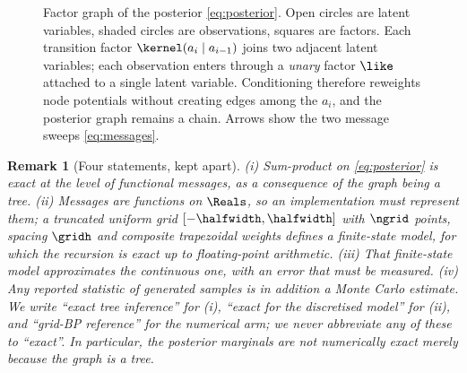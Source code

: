 \documentclass{article}
\newtheorem{remark}{Remark}
\begin{document}
\begin{figure}[t]
\centering
{}
\caption{Factor graph of the posterior \eqref{eq:posterior}. Open circles are latent variables,
shaded circles are observations, squares are factors. Each transition factor
$\kernel(a_i\mid a_{i-1})$ joins two adjacent latent variables; each observation enters through
a \emph{unary} factor $\like$ attached to a single latent variable. Conditioning therefore
reweights node potentials without creating edges among the $a_i$, and the posterior graph
remains a chain. Arrows show the two message sweeps \eqref{eq:messages}.}
\label{fig:factorgraph}
\end{figure}

\begin{remark}[Four statements, kept apart]
\label{rem:exact}
(i) Sum-product on \eqref{eq:posterior} is \emph{exact at the level of functional messages}, as a
consequence of the graph being a tree. (ii) Messages are functions on $\Reals$, so an
implementation must represent them; a truncated uniform grid $[-\halfwidth,\halfwidth]$ with
$\ngrid$ points, spacing $\gridh$ and composite trapezoidal weights defines a \emph{finite-state
model}, for which the recursion is \emph{exact up to floating-point arithmetic}. (iii) That
finite-state model \emph{approximates} the continuous one, with an error that must be measured.
(iv) Any reported statistic of generated samples is in addition a \emph{Monte Carlo estimate}.
We write ``exact tree inference'' for (i), ``exact for the discretised model'' for (ii), and
``grid-BP reference'' for the numerical arm; we never abbreviate any of these to ``exact''. In
particular, the posterior marginals are not numerically exact merely because the graph is a tree.
\end{remark}
\end{document}
